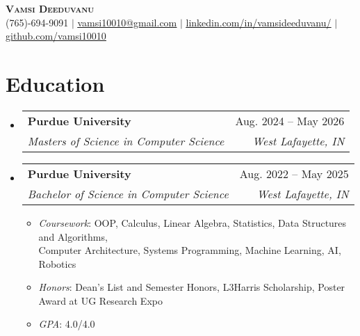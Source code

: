 \documentclass[letterpaper,11pt]{article}
\makeatletter
\newcommand{\resumeItem}[1]{
  \item\small{
    {#1 \vspace{-2pt}}
  }
}
\newcommand{\resumeSubheading}[4]{
  \vspace{-2pt}\item
    \begin{tabular*}{0.97\textwidth}[t]{l@{\extracolsep{\fill}}r}
      \textbf{\small#1} & \small#2 \\
      \textit{\small#3} & \textit{\small #4} \\
    \end{tabular*}\vspace{-7pt}
}
\newcommand{\resumeSubHeadingListStart}{\begin{itemize}[leftmargin=0.15in, label={}]}
\newcommand{\resumeSubHeadingListEnd}{\end{itemize}}
\newcommand{\resumeItemListStart}{\begin{itemize}}
\newcommand{\resumeItemListEnd}{\end{itemize}\vspace{-5pt}}
\makeatother
\begin{document}
\begin{center}
    \textbf{\Huge \scshape Vamsi Deeduvanu} \\ \vspace{1pt}
    \small (765)-694-9091 $|$ \href{mailto:vamsi10010@gmail.com}{\underline{vamsi10010@gmail.com}} $|$ 
    \href{https://www.linkedin.com/in/vamsideeduvanu}{\underline{linkedin.com/in/vamsideeduvanu/}} $|$
    \href{https://github.com/vamsi10010}{\underline{github.com/vamsi10010}}
\end{center}



\section{Education}
  \resumeSubHeadingListStart
    \resumeSubheading
      {Purdue University}{Aug. 2024 -- May 2026}
      {Masters of Science in Computer Science}{West Lafayette, IN}
    \resumeSubheading
      {Purdue University}{Aug. 2022 -- May 2025}
      {Bachelor of Science in Computer Science}{West Lafayette, IN}
      \resumeItemListStart
        \resumeItem{\textit{Coursework}: OOP, Calculus, Linear Algebra, Statistics, Data Structures and Algorithms, \\Computer Architecture,
        Systems Programming, Machine Learning, AI, Robotics
        }
        \resumeItem{\textit{Honors}: Dean's List and Semester Honors, L3Harris Scholarship, Poster Award at UG Research Expo}
        \resumeItem{\textit{GPA}: 4.0/4.0}
      \resumeItemListEnd
  \resumeSubHeadingListEnd


\end{document}
